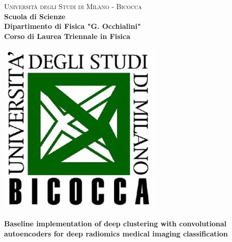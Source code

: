 \begin{titlepage}
        
        \centering
        
        \begin{minipage}[t]{1\textwidth}
        	\centering
        {
                {\LARGE\textsc{Università degli Studi di Milano - Bicocca}} \\
                \Large\textbf{Scuola di Scienze} \\
                \large\textbf{Dipartimento di Fisica "G. Occhialini"} \\
                \textbf{Corso di Laurea Triennale in Fisica} \\
                \par
        }
        \end{minipage}
        
        \centering
        \begin{minipage}[t]{\textwidth}
        	\vspace{10mm}
        \end{minipage}
         
        \centering
        \begin{minipage}[t]{1\textwidth}
       	\centering
        \includegraphics[scale=0.7]{images/logo.jpg}
        \end{minipage}
        
        \begin{minipage}[t]{\textwidth}
        \end{minipage}
        
		\vspace{10mm}
        
		\begin{center}
			\Huge{
				\textbf{Baseline implementation of deep clustering with convolutional autoencoders for deep radiomics medical imaging classification}
				}
		\end{center}
        

\end{titlepage}

